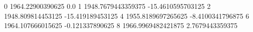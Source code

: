 0 1964.22900390625 0.0
1 1948.7679443359375 -15.4610595703125
2 1948.809814453125 -15.419189453125
4 1955.8189697265625 -8.4100341796875
6 1964.107666015625 -0.121337890625
8 1966.9969482421875 2.7679443359375
